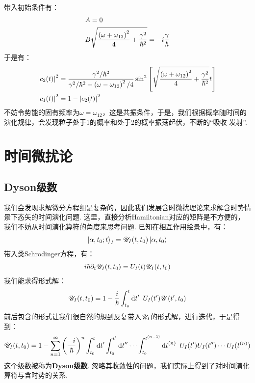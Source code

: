 带入初始条件有：
\begin{align*}
& A = 0 \\
& {B}{\sqrt{\frac{\left({\omega+\omega_{12}}\right)^{2}}{4} + \frac{\gamma^{2}}{\hbar^{2}}}} = -i\frac{\gamma}{\hbar}
\end{align*}
于是有：
\begin{align*}
& \abs{c_{2}(t)}^{2} = \frac{\gamma^{2}/\hbar^{2}}{\gamma^{2}/\hbar^{2} + \left({\omega-\omega_{12}}\right)^{2}/4}\sin^{2}\left[{\sqrt{\frac{\left({\omega+\omega_{12}}\right)^{2}}{4}+\frac{\gamma^{2}}{\hbar^{2}}}t}\right] \\
& \abs{c_{1}(t)}^{2} = 1 - \abs{c_{2}(t)}^{2}
\end{align*}
不妨令势能的固有频率为\(\omega=\omega_{12}\)，这是共振条件，于是，我们根据概率随时间的演化规律，会发现粒子处于1的概率和处于2的概率振荡起伏，不断的“吸收-发射”. 
\section{时间微扰论}
\subsection{Dyson级数}
我们会发现求解微分方程组是复杂的，因此我们发展含时微扰理论来求解含时势情景下态矢的时间演化问题. 这里，直接分析Hamiltonian对应的矩阵是不方便的，我们不妨从时间演化算符的角度来思考问题. 已知在相互作用绘景中，有：
\[
\ket{\alpha,t_{0};t}_{I} = \mathscr{U}_{I}(t,t_{0})\ket{\alpha,t_{0}}
\]
带入类Schrodinger方程，有：
\[
i\hbar\partial_{t}\mathscr{U}_{I}(t,t_{0}) = U_{I}(t)\mathscr{U}_{I}(t,t_{0})
\]
我们能求得形式解：
\[
\mathscr{U}_{I}(t,t_{0}) = 1 - \frac{i}{\hbar}\int_{t_0}^{t}\dd{t}'\ U_{I}(t')\mathscr{U}(t',t_{0})
\]
前后包含的形式让我们很自然的想到反复带入\(\mathscr{U}_{I}\)的形式解，进行迭代，于是得到：
\[
\cU_{I}(t,t_{0}) = 1 - \sum_{n=1}^{\infty}\br{\frac{-i}{\hh}}^{n}\int_{t_{0}}^{t}\dd{t}'\int_{t_{0}}^{t'}\dd{t}''\cdots\int_{t_{0}}^{t^{(n-1)}}\dd{t}^{(n)}\ U_{I}(t') U_{I}(t'')\cdots U_{I}(t^{(n)})
\]
这个级数被称为\textbf{Dyson级数}. 忽略其收敛性的问题，我们实际上得到了对时间演化算符与含时势的关系. 

